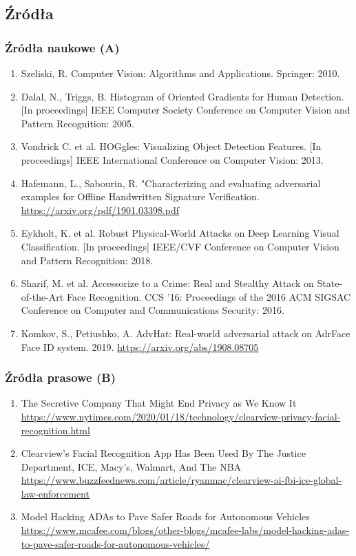 \documentclass{beamer}
\begin{document}
        \subsection{Źródła}
            \begin{frame}[shrink=15]
                \frametitle{Źródła naukowe (A)}
                \begin{enumerate}
                    \item Szeliski, R. Computer Vision: Algorithms and Applications. Springer: 2010.
                    \item Dalal, N., Triggs, B. Histogram of Oriented Gradients for Human Detection. [In proceedings] IEEE Computer Society Conference on Computer Vision and Pattern Recognition: 2005.
                    \item Vondrick C. et al. HOGgles: Visualizing Object Detection Features. [In proceedings] IEEE International Conference on Computer Vision: 2013.
                    \item Hafemann, L., Sabourin, R. "Characterizing and evaluating adversarial examples for Offline Handwritten Signature Verification.
                        \url{https://arxiv.org/pdf/1901.03398.pdf}
                    \item Eykholt, K. et al. Robust Physical-World Attacks on Deep Learning Visual Classification. [In proceedings] IEEE/CVF Conference on Computer Vision and Pattern Recognition: 2018.
                    \item Sharif, M. et al. Accessorize to a Crime: Real and Stealthy Attack on State-of-the-Art Face Recognition. CCS '16: Proceedings of the 2016 ACM SIGSAC Conference on Computer and Communications Security: 2016.
                    \item Komkov, S., Petiushko, A. AdvHat: Real-world adversarial attack on AdrFace Face ID system. 2019.
                        \url {https://arxiv.org/abs/1908.08705}
                \end{enumerate}
            \end{frame}

            \begin{frame}
                \frametitle{Źródła prasowe (B)}
                \begin{enumerate}
                    \item The Secretive Company That Might End Privacy as We Know It
                        \url{https://www.nytimes.com/2020/01/18/technology/clearview-privacy-facial-recognition.html}
                    \item Clearview’s Facial Recognition App Has Been Used By The Justice Department, ICE, Macy’s, Walmart, And The NBA
                        \url{https://www.buzzfeednews.com/article/ryanmac/clearview-ai-fbi-ice-global-law-enforcement}
                    \item Model Hacking ADAs to Pave Safer Roads for Autonomous Vehicles
                        \url{https://www.mcafee.com/blogs/other-blogs/mcafee-labs/model-hacking-adas-to-pave-safer-roads-for-autonomous-vehicles/}
                \end{enumerate}
            \end{frame}
\end{document}
